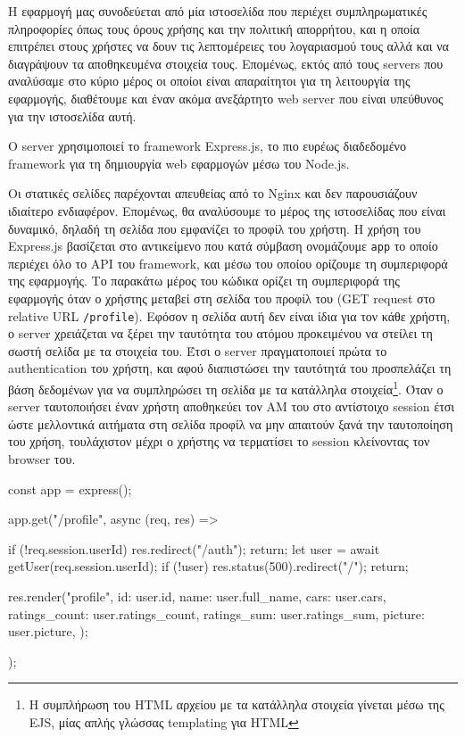 \documentclass[../thesis.tex]{subfiles}
\begin{document}
Η εφαρμογή μας συνοδεύεται από μία ιστοσελίδα που περιέχει συμπληρωματικές πληροφορίες όπως τους όρους χρήσης και την πολιτική απορρήτου, και η οποία επιτρέπει στους χρήστες να δουν τις λεπτομέρειες του λογαριασμού τους αλλά και να διαγράψουν τα αποθηκευμένα στοιχεία τους.
Επομένως, εκτός από τους servers που αναλύσαμε στο κύριο μέρος οι οποίοι είναι απαραίτητοι για τη λειτουργία της εφαρμογής, διαθέτουμε και έναν ακόμα ανεξάρτητο web server που είναι υπεύθυνος για την ιστοσελίδα αυτή.

\bigskip

Ο server χρησιμοποιεί το framework Express.js, το πιο ευρέως διαδεδομένο framework για τη δημιουργία web εφαρμογών μέσω του Node.js.

Οι στατικές σελίδες παρέχονται απευθείας από το Nginx και δεν παρουσιάζουν ιδιαίτερο ενδιαφέρον.
Επομένως, θα αναλύσουμε το μέρος της ιστοσελίδας που είναι δυναμικό, δηλαδή τη σελίδα που εμφανίζει το προφίλ του χρήστη.
Η χρήση του Express.js βασίζεται στο αντικείμενο που κατά σύμβαση ονομάζουμε \texttt{app} το οποίο περιέχει όλο το API του framework, και μέσω του οποίου ορίζουμε τη συμπεριφορά της εφαρμογής.
Το παρακάτω μέρος του κώδικα ορίζει τη συμπεριφορά της εφαρμογής όταν ο χρήστης μεταβεί στη σελίδα του προφίλ του (GET request στο relative URL \texttt{/profile}).
Εφόσον η σελίδα αυτή δεν είναι ίδια για τον κάθε χρήστη, ο server χρειάζεται να ξέρει την ταυτότητα του ατόμου προκειμένου να στείλει τη σωστή σελίδα με τα στοιχεία του.
Έτσι ο server πραγματοποιεί πρώτα το authentication του χρήστη, και αφού διαπιστώσει την ταυτότητά του προσπελάζει τη βάση δεδομένων για να συμπληρώσει τη σελίδα με τα κατάλληλα στοιχεία\footnote{Η συμπλήρωση του HTML αρχείου με τα κατάλληλα στοιχεία γίνεται μέσω της EJS, μίας απλής γλώσσας templating για HTML}.
Όταν ο server ταυτοποιήσει έναν χρήστη αποθηκεύει τον ΑΜ του στο αντίστοιχο session έτσι ώστε μελλοντικά αιτήματα στη σελίδα προφίλ να μην απαιτούν ξανά την ταυτοποίηση του χρήση, τουλάχιστον μέχρι ο χρήστης να τερματίσει το session κλείνοντας τον browser του.

\begin{codeblock}
  const app = express();

  app.get("/profile", async (req, res) => {
    if (!req.session.userId) {
      res.redirect("/auth");
      return;
    }
    let user = await getUser(req.session.userId);
    if (!user) {
      res.status(500).redirect("/");
      return;
    }

    res.render("profile", {
      id: user.id,
      name: user.full_name,
      cars: user.cars,
      ratings_count: user.ratings_count,
      ratings_sum: user.ratings_sum,
      picture: user.picture,
    });
  });
\end{codeblock}
\end{document}
